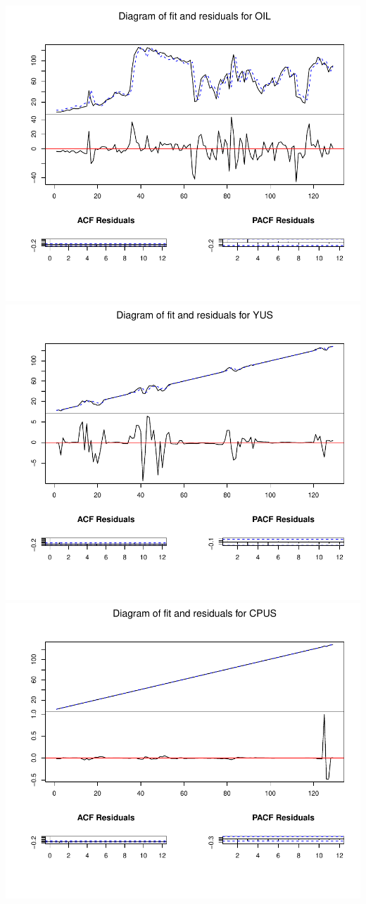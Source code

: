 \documentclass[11pt,preprint, authoryear]{elsarticle}
\numberwithin{equation}{section}
\numberwithin{figure}{section}
\numberwithin{table}{section}
\begin{document}
\includegraphics{replication_files/figure-latex/unnamed-chunk-3-1.pdf}
\includegraphics{replication_files/figure-latex/unnamed-chunk-3-2.pdf}
\includegraphics{replication_files/figure-latex/unnamed-chunk-3-3.pdf}
\end{document}
